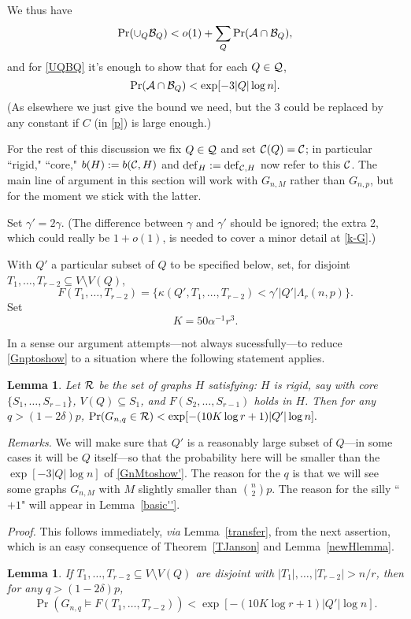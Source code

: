 \documentclass[letterpaper,11pt]{article}
\newtheorem{lemma}[thm]{Lemma}
\newcommand{\beq}[1]{\begin{equation}\label{#1}}
\newcommand{\enq}[0]{\end{equation}}
\newcommand{\mn}[0]{\medskip\noindent}
\newcommand{\nin}[0]{\noindent}
\newcommand{\sub}[0]{\subseteq}
\newcommand{\sm}[0]{\setminus}
\renewcommand{\dots}[0]{,\ldots,}
\newcommand{\A}[0]{{\cal A}}
\newcommand{\B}[0]{{\cal B}}
\newcommand{\cee}[0]{{\cal C}}
\newcommand{\eee}[0]{{\cal E}}
\newcommand{\Q}[0]{{\cal Q}}
\newcommand{\R}[0]{{\cal R}}
\newcommand{\deff}[0]{{\rm def}}
\newcommand{\0}[0]{\emptyset}
\newcommand{\C}[2]{{{#1}\choose{{#2}}}}
\newcommand{\ga}[0]{\alpha }
\newcommand{\gc}[0]{\gamma }
\newcommand{\gd}[0]{\delta }
\newcommand{\gL}[0]{\Lambda}
\begin{document}
\fi


We thus have
\[
\Pr(\cup_Q\B_Q) <
o(1)+  \sum_Q\Pr(\A\cap\B_Q),
\]
and for \eqref{UQBQ} it's enough to show that for each $Q\in \Q$,
\beq{Gnptoshow}
\Pr(\A\cap\B_Q) < \exp [-3|Q|\log n].
\enq
(As elsewhere we just give the bound we need,
but the 3 could be
replaced by any constant if $C$ (in \eqref{p}) is large enough.)



For the rest of this discussion we fix $Q\in \Q$ and set
$\cee(Q)=\cee$; in particular ``rigid," ``core,"
$b(H):=b(\cee,H)$ and $\deff_H:=\deff_{\cee,H}$ now
refer to
this $\cee$.
%
The main line of argument in this section will
work with $G_{n,M}$ rather than
$G_{n,p}$, but for the moment we stick with the
latter.

Set $\gc'=2\gc$.
(The difference between $\gc$ and $\gc'$ should be ignored;
the extra 2, which could really be $1+o(1)$, is needed to
cover a minor detail at \eqref{k-G}.)

With $Q'$ a particular subset of $Q$ to be specified below, set,
for disjoint $T_1\dots T_{r-2}\sub V\sm V(Q)$,
\[
F(T_1\dots T_{r-2})
=\{\kappa(Q',T_1\dots T_{r-2})< \gc' |Q'|\gL_r(n,p)\}.
\]
Set
\beq{K}
K= 50\ga^{-1}r^3.
\enq


\mn
In a sense our argument attempts---not always
sucessfully---to reduce
\eqref{Gnptoshow} to a situation where
the following statement applies.
\begin{lemma}\label{basic}
Let $\R$ be the set of graphs $H$ satisfying:
$H$ is rigid, say with core
$\{S_1\dots S_{r-1}\}$, $V(Q)\sub S_1$, and $F(S_2\dots S_{r-1})$
holds in $H$.
Then for any $q>(1-2\gd) p$,
$\Pr(G_{n,q}\in \R) <\exp[-(10K\log r+1)|Q'|\log n].$
\end{lemma}

\nin
{\em Remarks.}
We will make sure that $Q'$ is a reasonably large subset
of $Q$---in some cases it will be $Q$ itself---so that
the probability here will be
smaller than the $\exp [-3|Q|\log n]$ of \eqref{GnMtoshow'}.
The reason for the $q$ is that we will see some
graphs $G_{n,M}$ with
$M$ slightly smaller than $\C{n}{2}p$.
The reason for the silly ``$+1$" will appear in
Lemma~\ref{basic''}.



\mn
{\em Proof.}
This follows immediately, {\em via}
Lemma~\ref{transfer}, from the next assertion, which is an
easy consequence of
Theorem~\ref{TJanson} and Lemma~\ref{newHlemma}.
%
\begin{lemma}\label{basic'}
If $T_1\dots T_{r-2}\sub V\sm V(Q)$ are disjoint
with $|T_1|\dots |T_{r-2}|>n/r$,
then for any $q>(1-2\gd) p$,
\[\Pr(G_{n,q}\models
F(T_1\dots T_{r-2})) <\exp[-(10K\log r+1)|Q'|\log n].\]
\end{lemma}
%
\nin
\end{document}
